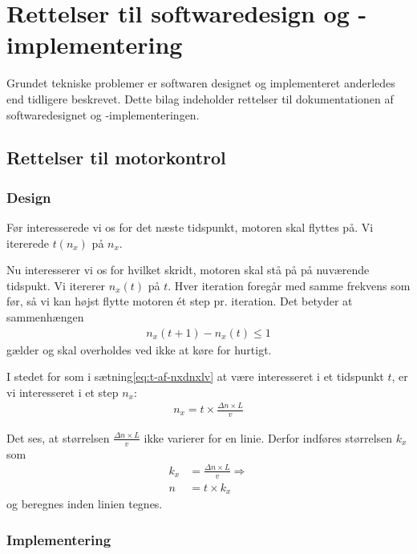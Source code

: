 \chapter{Rettelser til softwaredesign og -implementering}
\label{ch:bilag-rettelser-software}


Grundet tekniske problemer er softwaren designet og implementeret
anderledes end tidligere beskrevet. Dette bilag indeholder rettelser
til dokumentationen af softwaredesignet og -implementeringen.

\section{Rettelser til motorkontrol}

\subsection{Design}
\label{ssc:rettelse-design}

Før interesserede vi os for det næste tidspunkt, motoren skal flyttes
på. Vi itererede $t(n_x)$ på $n_x$.

Nu interesserer vi os for hvilket skridt, motoren skal stå på på
nuværende tidspukt. Vi itererer $n_x(t)$ på $t$. Hver iteration
foregår med samme frekvens som før, så vi kan højst flytte motoren ét
step pr. iteration. Det betyder at sammenhængen
\begin{align}
  n_x(t+1) - n_x(t) \leq 1
\end{align}
gælder og skal overholdes ved ikke at køre for hurtigt.

I stedet for som i sætning\vref{eq:t-af-nxdnxlv} at være interesseret i et
tidspunkt $t$, er vi interesseret i et step $n_x$:
\begin{align}
  n_x = t \times \frac{\Delta n \times L}v
\end{align}

Det ses, at størrelsen $\frac{\Delta n \times L}v$ ikke varierer for
en linie. Derfor indføres størrelsen $k_x$ som
\begin{align}
  k_x &= \frac{\Delta n \times L}v \Rightarrow \\
  n &= t \times k_x
\end{align}
og beregnes inden linien tegnes.


\subsection{Implementering}
\label{ssc:rettelse-implementering}

